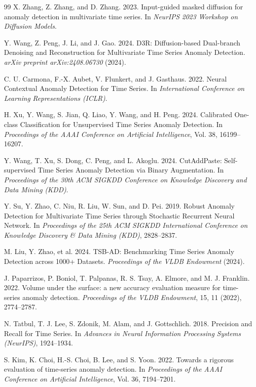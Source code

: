 \documentclass[sigconf,nonacm]{acmart}
\begin{document}
\begin{thebibliography}{99}
X. Zhang, Z. Zhang, and D. Zhang. 2023.
Input-guided masked diffusion for anomaly detection in multivariate time series.
In \textit{NeurIPS 2023 Workshop on Diffusion Models}.

Y. Wang, Z. Peng, J. Li, and J. Gao. 2024.
D3R: Diffusion-based Dual-branch Denoising and Reconstruction for Multivariate Time Series Anomaly Detection.
\textit{arXiv preprint arXiv:2408.06730} (2024).

C. U. Carmona, F.-X. Aubet, V. Flunkert, and J. Gasthaus. 2022.
Neural Contextual Anomaly Detection for Time Series.
In \textit{International Conference on Learning Representations (ICLR)}.

H. Xu, Y. Wang, S. Jian, Q. Liao, Y. Wang, and H. Peng. 2024.
Calibrated One-class Classification for Unsupervised Time Series Anomaly Detection.
In \textit{Proceedings of the AAAI Conference on Artificial Intelligence}, Vol. 38, 16199--16207.

Y. Wang, T. Xu, S. Dong, C. Peng, and L. Akoglu. 2024.
CutAddPaste: Self-supervised Time Series Anomaly Detection via Binary Augmentation.
In \textit{Proceedings of the 30th ACM SIGKDD Conference on Knowledge Discovery and Data Mining (KDD)}.

Y. Su, Y. Zhao, C. Niu, R. Liu, W. Sun, and D. Pei. 2019.
Robust Anomaly Detection for Multivariate Time Series through Stochastic Recurrent Neural Network.
In \textit{Proceedings of the 25th ACM SIGKDD International Conference on Knowledge Discovery \& Data Mining (KDD)}, 2828--2837.

M. Liu, Y. Zhao, et al. 2024.
TSB-AD: Benchmarking Time Series Anomaly Detection across 1000+ Datasets.
\textit{Proceedings of the VLDB Endowment} (2024).

J. Paparrizos, P. Boniol, T. Palpanas, R. S. Tsay, A. Elmore, and M. J. Franklin. 2022.
Volume under the surface: a new accuracy evaluation measure for time-series anomaly detection.
\textit{Proceedings of the VLDB Endowment}, 15, 11 (2022), 2774--2787.

N. Tatbul, T. J. Lee, S. Zdonik, M. Alam, and J. Gottschlich. 2018.
Precision and Recall for Time Series.
In \textit{Advances in Neural Information Processing Systems (NeurIPS)}, 1924--1934.

S. Kim, K. Choi, H.-S. Choi, B. Lee, and S. Yoon. 2022.
Towards a rigorous evaluation of time-series anomaly detection.
In \textit{Proceedings of the AAAI Conference on Artificial Intelligence}, Vol. 36, 7194--7201.


\end{thebibliography}
\end{document}
